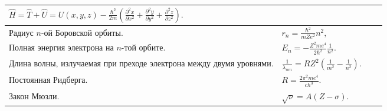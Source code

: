 \documentclass{article}
\begin{document}
\begin{tabular}{ |p{5cm}|p{4.5cm}|p{5cm}|p{4.5cm}|  }
$
\hat{H} = \hat{T} + \hat{U} = 
U(x, y, z) - \frac{\hbar^2}{2m} 
\left( 
  \frac{\partial^2 x}{\partial x^2} +
  \frac{\partial^2 y}{\partial y^2} +
  \frac{\partial^2 z}{\partial z^2}
\right).
$                                                                            &  %
                                                                             &  %
                                                                             \\ %
\hline
Радиус $n$-ой Боровской орбиты.                                              &  %
$r_n = \frac{\hbar^2}{mZe^2}n^2,$                                            &  %
                                                                             &  %
                                                                             \\ %
\hline
Полная энергия электрона на $n$-той орбите.                                  &  %
$E_n = -\frac{Z^2 m e^4}{2\hbar^2}\frac{1}{n^2}.$                            &  %
                                                                             &  %
                                                                             \\ %
\hline
Длина волны, излучаемая при преходе электрона между двумя уровнями.          &  %
$
\frac{1}{\lambda_{nm}} = 
RZ^2 \left( \frac{1}{m^2} - \frac{1}{n^2} \right).
$                                                                            &  %
                                                                             &  %
                                                                             \\ %
\hline
Постоянная Ридберга.                                                         &  %
$R = \frac{2 \pi^2 m e^4}{ch^3}.$                                            &  %
                                                                             &  %
                                                                             \\ %
\hline
Закон Мюзли.                                                                 &  %
$\sqrt{\nu} = A(Z-\sigma).$                                                  &  %
                                                                             &  %
                                                                             \\ %

\end{tabular}
\end{document}
